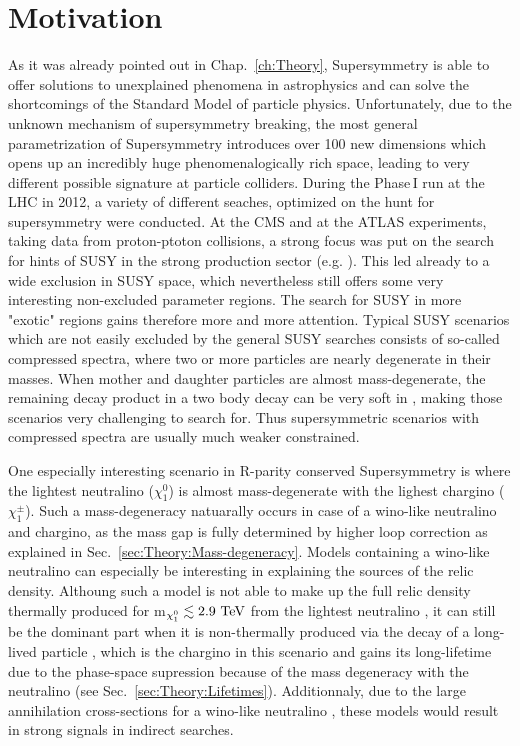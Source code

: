 \section{Motivation}
\label{sec:Motivation}
As it was already pointed out in Chap.~\ref{ch:Theory}, Supersymmetry is able to offer solutions to unexplained phenomena in astrophysics and can solve the shortcomings of the Standard Model of particle physics.
Unfortunately, due to the unknown mechanism of supersymmetry breaking, the most general parametrization of Supersymmetry introduces over 100 new dimensions which opens up an incredibly huge phenomenalogically rich space, 
leading to very different possible signature at particle colliders. 
During the Phase\,I run at the LHC in 2012, a variety of different seaches, optimized on the hunt for supersymmetry were conducted.
At the CMS and at the ATLAS experiments, taking data from proton-ptoton collisions, a strong focus was put on the search for hints of SUSY in the strong production sector (e.g. \cite{bib:CMS:RA2_8TeV,bib:CMS:MT2_8TeV,bib:ATLAS:JetPlusMET_8TeV}).
This led already to a wide exclusion in SUSY space, which nevertheless still offers some very interesting non-excluded parameter regions.
The search for SUSY in more "exotic" regions gains therefore more and more attention. 
Typical SUSY scenarios which are not easily excluded by the general SUSY searches consists of so-called compressed spectra, where two or more particles are nearly degenerate in their masses.
When mother and daughter particles are almost mass-degenerate, the remaining decay product in a two body decay can be very soft in \pt, making those scenarios very challenging to search for.
Thus supersymmetric scenarios with compressed spectra are usually much weaker constrained.

One especially interesting scenario in R-parity conserved Supersymmetry is where the lightest neutralino ($\chi^{0}_1$) is almost mass-degenerate with the lighest chargino ($\chi^{\pm}_1$).
Such a mass-degeneracy natuarally occurs in case of a wino-like neutralino and chargino, as the mass gap is fully determined by higher loop correction as explained in Sec.~\ref{sec:Theory:Mass-degeneracy}.
Models containing a wino-like neutralino can especially be interesting in explaining the sources of the relic density.
Althoung such a model is not able to make up the full relic density thermally produced for m$_{\chi^{0}_1}\lesssim 2.9\,\,\text{Te}\kern-0.06667em\text{V}$ from the lightest neutralino \cite{bib:Ibe:DarkMatter_2015}, 
it can still be the dominant part when it is non-thermally produced via the decay of a long-lived particle \cite{bib:Moroi:DarkMatter_2013}, which is the chargino in this scenario 
and gains its long-lifetime due to the phase-space supression because of the mass degeneracy with the neutralino (see Sec.~\ref{sec:Theory:Lifetimes}).
Additionnaly, due to the large annihilation cross-sections for a wino-like neutralino \cite{bib:Hisano:DarkMatter_2003}, these models would result in strong signals in indirect searches.\\


